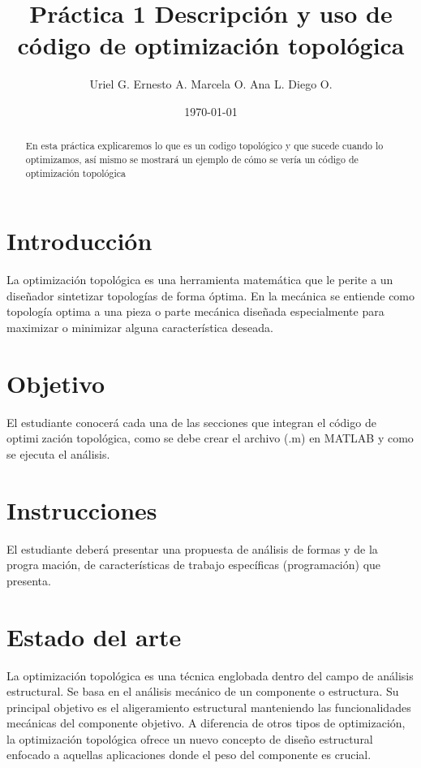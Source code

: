 \documentclass{article}
\author{Uriel G.
Ernesto A.
Marcela O.
Ana L.
Diego O.}%
\title{Pr\'actica 1 Descripci\'on y uso de c\'odigo de optimizaci\'on topol\'ogica} %
\date{\today}
\begin{document}

\maketitle %

\begin{abstract} %
En esta práctica explicaremos lo que es un codigo topológico y  que sucede cuando lo optimizamos, así mismo se mostrará un ejemplo de cómo se vería un código de  optimización  topológica
\end{abstract}
\section{Introducción}
La optimización topológica es una herramienta matemática que le perite a un diseñador sintetizar topologías de forma óptima. En la mecánica se entiende como topología optima a una pieza o parte mecánica diseñada especialmente para maximizar o minimizar alguna característica deseada\cite{1}. 


\section{Objetivo} %

El estudiante conocer\'a cada una de las secciones que integran el código de optimizaci\'on topol\'ogica, como se debe crear el archivo (.m) en MATLAB y como se ejecuta 
el an\'alisis.

\section{Instrucciones}
El estudiante deberá presentar una propuesta de análisis de formas y de la programación, de características de trabajo específicas (programación) que presenta.

\section{Estado del arte}
La optimizaci\'on topol\'ogica es una t\'ecnica englobada dentro del campo de an\'alisis estructural. Se basa en el an\'alisis mec\'anico de un componente o estructura. Su principal objetivo es el aligeramiento estructural manteniendo las funcionalidades mec\'anicas del componente objetivo. A diferencia de otros tipos de optimizaci\'on, la optimizaci\'on topol\'ogica ofrece un nuevo concepto de diseño estructural enfocado a aquellas aplicaciones donde el peso del componente es crucial\cite{2}.
\end{document}
